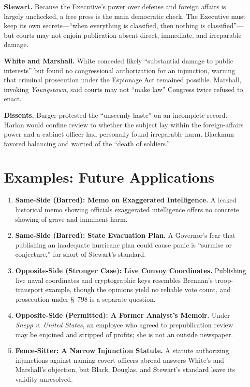 \documentclass[12pt]{article}
\begin{document}
\textbf{Stewart.} Because the Executive's power over defense and foreign affairs is largely unchecked, a free press is the main democratic check. The Executive must keep its own secrets---``when everything is classified, then nothing is classified''---but courts may not enjoin publication absent direct, immediate, and irreparable damage.

\textbf{White and Marshall.} White conceded likely ``substantial damage to public interests'' but found no congressional authorization for an injunction, warning that criminal prosecution under the Espionage Act remained possible. Marshall, invoking \textit{Youngstown}, said courts may not ``make law'' Congress twice refused to enact.

\textbf{Dissents.} Burger protested the ``unseemly haste'' on an incomplete record. Harlan would confine review to whether the subject lay within the foreign-affairs power and a cabinet officer had personally found irreparable harm. Blackmun favored balancing and warned of the ``death of soldiers.''

\section{Examples: Future Applications}

\begin{enumerate}
\item \textbf{Same-Side (Barred): Memo on Exaggerated Intelligence.} A leaked historical memo showing officials exaggerated intelligence offers no concrete showing of grave and imminent harm.
\item \textbf{Same-Side (Barred): State Evacuation Plan.} A Governor's fear that publishing an inadequate hurricane plan could cause panic is ``surmise or conjecture,'' far short of Stewart's standard.
\item \textbf{Opposite-Side (Stronger Case): Live Convoy Coordinates.} Publishing live naval coordinates and cryptographic keys resembles Brennan's troop-transport example, though the opinions yield no reliable vote count, and prosecution under \S~798 is a separate question.
\item \textbf{Opposite-Side (Permitted): A Former Analyst's Memoir.} Under \textit{Snepp v. United States}, an employee who agreed to prepublication review may be enjoined and stripped of profits; she is not an outside newspaper.
\item \textbf{Fence-Sitter: A Narrow Injunction Statute.} A statute authorizing injunctions against naming covert officers abroad answers White's and Marshall's objection, but Black, Douglas, and Stewart's standard leave its validity unresolved.
\end{enumerate}
\end{document}
